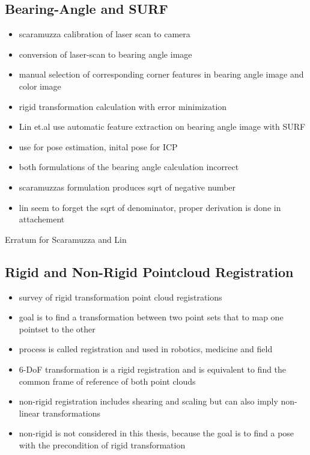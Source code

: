 \subsection{Bearing-Angle and SURF}

\begin{itemize}
    \item scaramuzza calibration of laser scan to camera\cite{scaramuzza_iros2007}
    \item conversion of laser-scan to bearing angle image
    \item manual selection of corresponding corner features in bearing angle image and color image
    \item rigid transformation calculation with error minimization

    \item Lin et.al use automatic feature extraction on bearing angle image with SURF\cite{lin_easp2017}
    \item use for pose estimation, inital pose for ICP

    \item both formulations of the bearing angle calculation incorrect
    \item scaramuzzas formulation produces sqrt of negative number
    \item lin seem to forget the sqrt of denominator, proper derivation is done in attachement
\end{itemize}
Erratum for Scaramuzza and Lin

\subsection{Rigid and Non-Rigid Pointcloud Registration}

\begin{itemize}
    \item survey of rigid transformation point cloud registrations\cite{bellekens_ambient2014}\cite{pomerleau_2015}
    \item goal is to find a transformation between two point sets that to map one pointset to the other
    \item process is called registration and used in robotics, medicine and field
    \item 6-DoF transformation is a rigid registration and is equivalent to find the common frame of reference of both point clouds
    \item non-rigid registration includes shearing and scaling but can also imply non-linear transformations
    \item non-rigid is not considered in this thesis, because the goal is to find a pose with the precondition of rigid transformation
\end{itemize}

